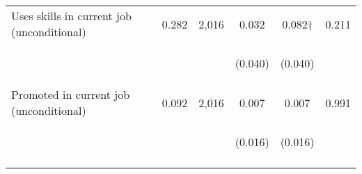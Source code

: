 \begin{table}[h!]
{\begin{tabular}{lccccc}
\noalign{\smallskip}Uses skills in current job (unconditional) & 0.282 & 2,016 & 0.032 & 0.082† & 0.211\\
 & \begin{footnotesize}\end{footnotesize} & \begin{footnotesize}\end{footnotesize} & \begin{footnotesize}(0.040)\end{footnotesize} & \begin{footnotesize}(0.040)\end{footnotesize} & \begin{footnotesize}\end{footnotesize}\\
\noalign{\smallskip}Promoted in current job (unconditional) & 0.092 & 2,016 & 0.007 & 0.007 & 0.991\\
 & \begin{footnotesize}\end{footnotesize} & \begin{footnotesize}\end{footnotesize} & \begin{footnotesize}(0.016)\end{footnotesize} & \begin{footnotesize}(0.016)\end{footnotesize} & \begin{footnotesize}\end{footnotesize}\\
\noalign{\smallskip}
\hline
\hline
\end{tabular}\\
}
    \label{tab:my_label}
    \end{table}